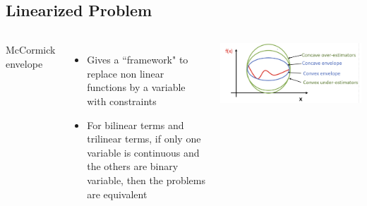 \documentclass{beamer}
\begin{document}
\subsection{Linearized Problem}
\begin{frame}
	\begin{columns}
		McCormick envelope\footnotemark[1]
		\begin{itemize}
			\item Gives a ``framework" to replace non linear functions by a variable with constraints
			\item For bilinear terms and trilinear terms, if only one variable is continuous and the others are binary variable, then the problems are equivalent
		\end{itemize}
		
		\includegraphics[width=\textwidth]{../figure/mccormick.png}\footnotemark[2]
	\end{columns}
\end{frame}
\end{document}
